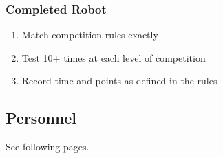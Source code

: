 \documentclass[12pt]{article}
\begin{document}
\subsubsection{Completed Robot}
	\begin{enumerate}[noitemsep]
		\item Match competition rules exactly
		\item Test 10+ times at each level of competition
		\item Record time and points as defined in the rules
	\end{enumerate}

\subsection{Personnel}

See following pages.
\end{document}
